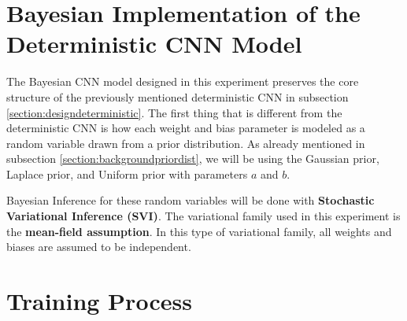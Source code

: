 \documentclass[ %
                    author={Revalda Putawara},
                supervisor={Dr. James Pope},
                    degree={MSc},
                     title={Robustness of Bayesian Neural Networks Design Choices Against Weight and Bias Perturbation Induced by Single Event Upsets (SEUs)},
                      type={},
                      year={2025}]{dissertation}
\begin{document}
\section{Bayesian Implementation of the Deterministic CNN Model} \label{subsection:bayesianimplementationdist}

The Bayesian CNN model designed in this experiment preserves the core structure of the previously mentioned deterministic CNN in subsection \ref{section:designdeterministic}. The first thing that is different from the deterministic CNN is how each weight and bias parameter is modeled as a random variable drawn from a prior distribution. As already mentioned in subsection \ref{section:backgroundpriordist}, we will be using the Gaussian prior, Laplace prior, and Uniform prior with parameters $a$ and $b$.

Bayesian Inference for these random variables will be done with \textbf{Stochastic Variational Inference (SVI)}. The variational family used in this experiment is the \textbf{mean-field assumption}. In this type of variational family, all weights and biases are assumed to be independent.





\section{Training Process}

\end{document}
